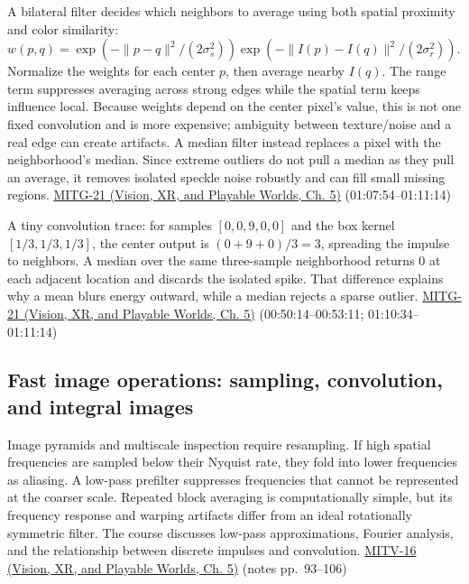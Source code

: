 A bilateral filter decides which neighbors to average using both spatial proximity and color similarity: \(w(p,q)=\exp(-\|p-q\|^2/(2\sigma_s^2))\exp(-\|I(p)-I(q)\|^2/(2\sigma_r^2))\). Normalize the weights for each center \(p\), then average nearby \(I(q)\). The range term suppresses averaging across strong edges while the spatial term keeps influence local. Because weights depend on the center pixel's value, this is not one fixed convolution and is more expensive; ambiguity between texture/noise and a real edge can create artifacts. A median filter instead replaces a pixel with the neighborhood's median. Since extreme outliers do not pull a median as they pull an average, it removes isolated speckle noise robustly and can fill small missing regions. \href{../07-Vision-XR-and-Playable-Worlds/main.pdf\#nameddest=04-visual-computing-ii-ch036-mitg-21---image-processing}{MITG-21 (Vision, XR, and Playable Worlds, Ch. 5)} (01:07:54--01:11:14)

A tiny convolution trace: for samples \([0,0,9,0,0]\) and the box kernel \([1/3,1/3,1/3]\), the center output is \((0+9+0)/3=3\), spreading the impulse to neighbors. A median over the same three-sample neighborhood returns \(0\) at each adjacent location and discards the isolated spike. That difference explains why a mean blurs energy outward, while a median rejects a sparse outlier. \href{../07-Vision-XR-and-Playable-Worlds/main.pdf\#nameddest=04-visual-computing-ii-ch036-mitg-21---image-processing}{MITG-21 (Vision, XR, and Playable Worlds, Ch. 5)} (00:50:14--00:53:11; 01:10:34--01:11:14)

\subsection{Fast image operations: sampling, convolution, and integral images}\label{03-visual-computing-i-ch004-fast-image-operations-sampling-convolution-and-integral-images}

\hypertarget{03-visual-computing-i-ch004-fast-image-operations-sampling-convolution-and-integral-images}{}

Image pyramids and multiscale inspection require resampling. If high spatial frequencies are sampled below their Nyquist rate, they fold into lower frequencies as aliasing. A low-pass prefilter suppresses frequencies that cannot be represented at the coarser scale. Repeated block averaging is computationally simple, but its frequency response and warping artifacts differ from an ideal rotationally symmetric filter. The course discusses low-pass approximations, Fourier analysis, and the relationship between discrete impulses and convolution. \href{../07-Vision-XR-and-Playable-Worlds/main.pdf\#nameddest=04-visual-computing-ii-ch036-mitv-16---fast-convolution-low-pass-filter-approximations-integral-images-us-6457032}{MITV-16 (Vision, XR, and Playable Worlds, Ch. 5)} (notes pp.~93--106)


